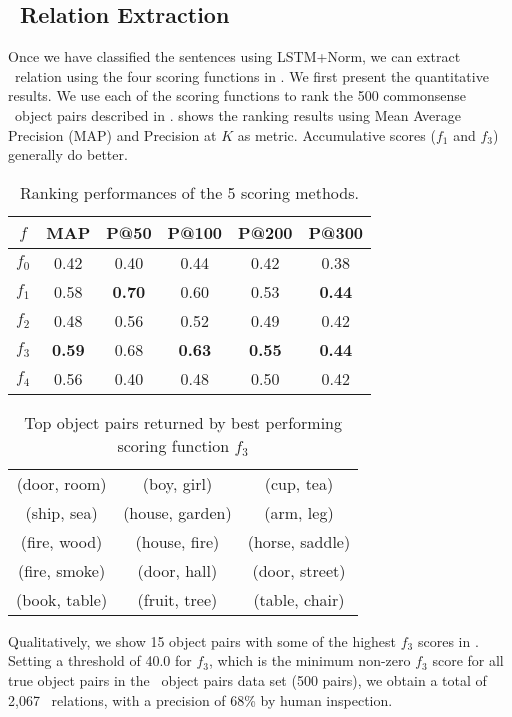 \subsection{\lnear\ Relation Extraction}
Once we have classified the sentences using LSTM+Norm, we can extract \lnear\
relation using the four scoring functions in .
We first present the quantitative results. 
We use each of the scoring functions to 
rank the 500 commonsense \lnear\ object pairs described in . 
\tabref{tab:3m} shows the ranking results using
Mean Average Precision (MAP) and Precision at $K$ as metric. 
Accumulative scores ($f_1$ and $f_3$) generally do better.
\begin{table}[t]
	\centering
	\begin{tabular}{|cccccc|}
		\hline
		${f}$	& {MAP} & {P@50} & {P@100}  &  {P@200}& {P@300}\\ \hline
		$f_0$ & 0.42 & 0.40 & 0.44 & 0.42 & 0.38 \\ \hline
		$f_1$	& 0.58  & {\bf 0.70} & 0.60& 0.53 & {\bf 0.44}\\\hline
		$f_2$	& 0.48 & 0.56 & 0.52  & 0.49 & 0.42\\\hline
		$f_3$	& {\bf 0.59} & 0.68& {\bf 0.63} & {\bf 0.55} & {\bf 0.44}\\\hline
		$f_4$	& 0.56 & 0.40 & 0.48 & 0.50 & 0.42\\\hline
	\end{tabular}
	\caption{Ranking performances of the 5 scoring methods.\vspace{-10pt}}
	\label{tab:3m}
\end{table} 
\begin{table}[th!]
	\centering
	\begin{tabular}{|ccc|}
		\hline
		(door, room)  & (boy, girl)     & (cup, tea)      \\
		(ship, sea)   & (house, garden) & (arm, leg)      \\
		(fire, wood)  & (house, fire)   & (horse, saddle) \\
		(fire, smoke) & (door, hall)    & (door, street)  \\
		(book, table) & (fruit, tree)   & (table, chair)  \\ \hline
	\end{tabular}
	\caption{Top object pairs returned by best performing scoring function $f_3$}
	\label{tbl:toppairs}
\end{table} 

Qualitatively, we show 15 object pairs with some of the highest $f_3$ scores
in \tabref{tbl:toppairs}.
Setting a threshold of 40.0 for $f_3$, which is the minimum non-zero
$f_3$ score for all true object pairs in the \lnear\ object pairs 
data set (500 pairs), we obtain a total of 2,067 \lnear\ relations, with
a precision of 68\% by human inspection.


